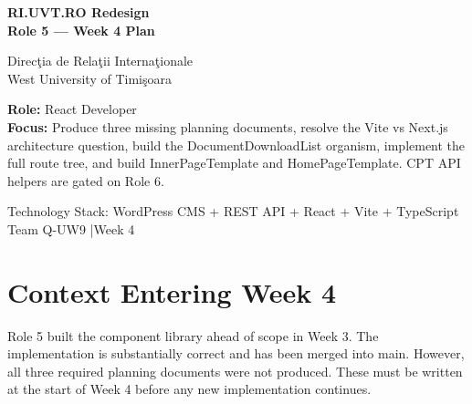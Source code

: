 \documentclass[12pt,a4paper]{article}
\begin{document}

\begin{titlepage}
    \pagecolor{uvtDarkBlue}
    \color{white}

    \vspace*{2cm}

    {\Huge\bfseries RI.UVT.RO Redesign\\[0.25em]
    Role 5 --- Week 4 Plan\par}

    \vspace{0.8cm}

    {\Large Direc\c{t}ia de Rela\c{t}ii Interna\c{t}ionale\\
    West University of Timi\c{s}oara\par}

    \vspace{1.5cm}

    \begin{yellowbox}
        \color{textGray}
        \textbf{Role:} React Developer\\[0.3em]
        \textbf{Focus:} Produce three missing planning documents, resolve the
        Vite vs Next.js architecture question, build the DocumentDownloadList organism,
        implement the full route tree, and build InnerPageTemplate and HomePageTemplate.
        CPT API helpers are gated on Role 6.
    \end{yellowbox}

    \vfill

    {\large Technology Stack: WordPress CMS + REST API + React + Vite + TypeScript\\[0.4em]
    Team Q-UW9 \quad|\quad Week 4}

    \vspace{1cm}
\end{titlepage}

\nopagecolor
\color{textGray}

\tableofcontents
\newpage

\section{Context Entering Week 4}

Role 5 built the component library ahead of scope in Week 3. The implementation is
substantially correct and has been merged into main. However, all three required planning
documents were not produced. These must be written at the start of Week 4 before any new
implementation continues.
\end{document}
